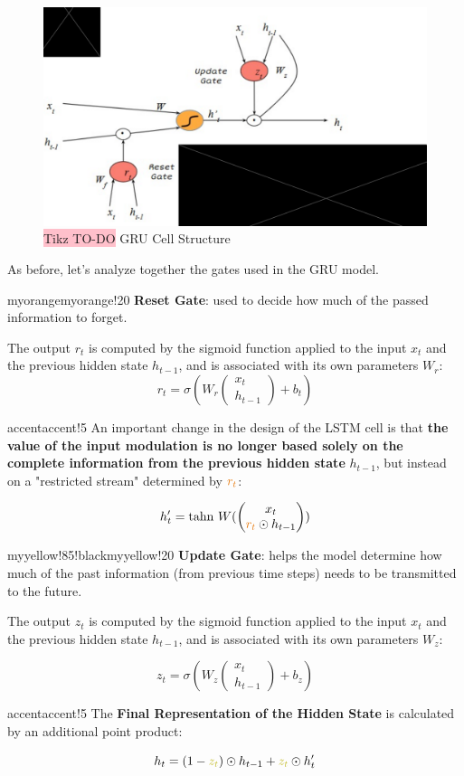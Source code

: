 \begin{figure}[!htbp]
    \centering
    \includegraphics[width=0.85\linewidth]{tikz/chapter6 - GRU.pdf}
    \caption{{\color{red}\colorbox{pink}{Tikz TO-DO}} GRU Cell Structure}
\end{figure}

As before, let's analyze together the gates used in the GRU model.

\begin{remark}{myorange}{myorange!20}
\textbf{Reset Gate}: used to decide how much of the passed information to forget.

The output $r_t$ is computed by the sigmoid function applied to the input $x_t$ and the previous hidden state $h_{t-1}$, and is associated with its own parameters $W_r$:
$$ r_t = \sigma(W_r
\begin{pmatrix}
x_t \\
h_{t-1}
\end{pmatrix} + b_t)
$$
\end{remark}

\begin{remark}{accent}{accent!5}
An important change in the design of the LSTM cell is that \textbf{the value of the input modulation is no longer based solely on the complete information from the previous hidden state} $h_{t-1}$, but instead on a "restricted stream" determined by $\textcolor{myorange}{r_t}$:

$$ h'_t = \text{tahn }W(
\begin{pmatrix}
x_t \\
\textcolor{myorange}{r_t} \odot h_{t-1}
\end{pmatrix})
$$
\end{remark}

\begin{remark}{myyellow!85!black}{myyellow!20}
\textbf{Update Gate}: helps the model determine how much of the past information (from previous time steps) needs to be transmitted to the future.

The output $z_t$ is computed by the sigmoid function applied to the input $x_t$ and the previous hidden state $h_{t-1}$, and is associated with its own parameters $W_z$:

$$ z_t = \sigma(W_z
\begin{pmatrix}
x_t \\
h_{t-1}
\end{pmatrix} + b_z)
$$
\end{remark}


\begin{remark}{accent}{accent!5}
The \textbf{Final Representation of the Hidden State} is calculated by an additional point product:

$$h_t = (1-\textcolor{myyellow!85!black}{z_t})\odot h_{t-1}+\textcolor{myyellow!85!black}{z_t} \odot h'_t$$
\end{remark}
